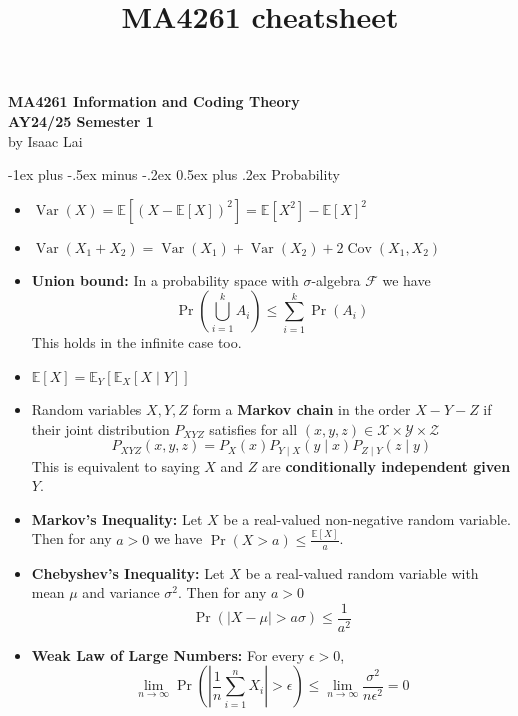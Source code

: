 \documentclass[frenchspacing,9pt,landscape,a4paper]{article}
\title{MA4261 cheatsheet}
\makeatletter
\renewcommand{\section}{\@startsection{section}{1}{0mm}%
                                {-1ex plus -.5ex minus -.2ex}%
                                {0.5ex plus .2ex}%
                                {\normalfont\large\bfseries}}
\newcommand{\abs}[1]{\left\lvert #1 \right\rvert}
\DeclareMathOperator{\pr}{Pr}
\DeclareMathOperator{\var}{Var}
\DeclareMathOperator{\cov}{Cov}
\theoremstyle{remark}
\makeatother
\begin{document}
\raggedright
\footnotesize

\begin{multicols}{4} %
\setlength{\premulticols}{1pt}
\setlength{\postmulticols}{1pt}
\setlength{\multicolsep}{1pt}
\setlength{\columnsep}{2pt}
\begin{mdframed}
\begin{center}
    \large{\textbf{MA4261 Information and Coding Theory}} \\
    \normalsize{\textbf{AY24/25 Semester 1}}\\
    \small{by Isaac Lai}
\end{center}	
\end{mdframed}

\section{Probability}
\begin{itemize}
    \item $\var(X)=\mathbb{E}[(X-\mathbb{E}[X])^2]=\mathbb{E}[X^2]-\mathbb{E}[X]^2$
    \item $\var(X_1+X_2)=\var(X_1)+\var(X_2)+2\cov(X_1,X_2)$
    \item \textbf{Union bound:} In a probability space with $\sigma$-algebra  $\mathcal{F}$ we have
        \[\pr\left(\bigcup_{i=1}^k A_i\right)\leq\sum_{i=1}^k\pr(A_i)\] This holds in the infinite case
        too.
    \item $\mathbb{E}[X]=\mathbb{E}_Y[\mathbb{E}_X[X\mid Y]]$
    \item Random variables $X,Y,Z$ form a \textbf{Markov chain} in the order  $X-Y-Z$ if their joint
        distribution $P_{XYZ}$ satisfies for all  $(x,y,z)\in\mathcal{X}\times\mathcal{Y}\times\mathcal{Z}$
        \[P_{XYZ}(x,y,z)=P_X(x)P_{Y\mid X}(y\mid x)P_{Z\mid Y}(z\mid y)\]
        This is equivalent to saying $X$ and  $Z$ are \textbf{conditionally independent given $Y$}.
    \item \textbf{Markov's Inequality:} Let $X$ be a real-valued non-negative random variable. Then for any
        $a>0$ we have  $\pr(X>a)\leq \frac{\mathbb{E}[X]}{a}$.
    \item \textbf{Chebyshev's Inequality:} Let $X$ be a real-valued random variable with mean  $\mu$ and
        variance  $\sigma^2$. Then for any $a>0$
        \[\pr(\abs{X-\mu}>a\sigma)\leq \frac{1}{a^2}\]
    \item \textbf{Weak Law of Large Numbers:} For every $\epsilon>0$,
        \[\lim_{n\to\infty}\pr\left(\abs{\frac{1}{n}\sum_{i=1}^n
        X_i}>\epsilon\right)\leq\lim_{n\to\infty}\frac{\sigma^2}{n\epsilon^2}=0\]
\end{itemize}

\end{multicols}
\end{document}
